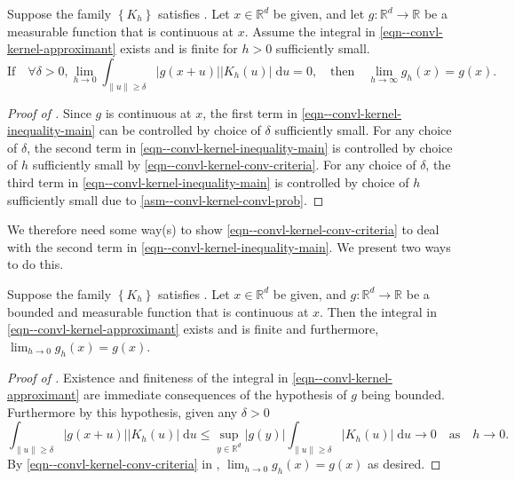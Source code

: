 \begin{lemma}
\label{lem--convl-kernel-conv-criteria}
Suppose the family \(\left\{ K_{h} \right\}\) satisfies
.
Let \(x \in \mathbb{R}^{d}\) be given, and let \(g : \mathbb{R}^{d} \to
\mathbb{R}\) be a measurable function that is continuous at \(x\).
Assume the integral in \eqref{eqn--convl-kernel-approximant} exists and is
finite for \(h > 0\) sufficiently small.
\begin{equation}
  \text{If} \quad
  \forall \delta > 0, \lim_{h \to 0} \int_{\|u\| \geq \delta} |g
  (x + u)| \left| K_{h} (u) \right| \; \mathrm{d} u = 0,
  \quad \text{then} \quad
  \lim_{h \to \infty} g_{h} (x) = g (x).
  \label{eqn--convl-kernel-conv-criteria}
\end{equation}
\end{lemma}

\begin{proof}[Proof of ]
Since \(g\) is continuous at \(x\), the first term in
\eqref{eqn--convl-kernel-inequality-main} can be controlled by choice of
\(\delta\) sufficiently small.
For any choice of \(\delta\), the second term in
\eqref{eqn--convl-kernel-inequality-main} is controlled by choice of \(h\)
sufficiently small by
\eqref{eqn--convl-kernel-conv-criteria}.
For any choice of \(\delta\), the third term in
\eqref{eqn--convl-kernel-inequality-main} is controlled by choice of \(h\)
sufficiently small due to 
\ref{asm--convl-kernel-convl-prob}.
\end{proof}

We therefore need some way(s) to show \eqref{eqn--convl-kernel-conv-criteria} to
deal with the second term in \eqref{eqn--convl-kernel-inequality-main}.
We present two ways to do this.


\begin{theorem}
\label{thm--convl-kernel-conv-bounded}
Suppose the family \(\left\{ K_{h} \right\}\) satisfies
.
Let \(x \in \mathbb{R}^{d}\) be given, and \(g : \mathbb{R}^{d} \to \mathbb{R}\)
be a bounded and measurable function that is continuous at \(x\).
Then the integral in \eqref{eqn--convl-kernel-approximant} exists and is finite
and furthermore, \(\lim_{h \to 0} g_{h} (x) = g (x)\).
\end{theorem}

\begin{proof}[Proof of ]
Existence and finiteness of the integral in
\eqref{eqn--convl-kernel-approximant} are immediate consequences of the
hypothesis of \(g\) being bounded.
Furthermore by this hypothesis, given any \(\delta > 0\)
\begin{equation*}
  \int_{\|u\| \geq \delta} |g (x + u)| \left| K_{h} (u) \right| \; \mathrm{d} u
  \leq \sup_{y \in \mathbb{R}^{d}} |g (y)| \int_{\|u\| \geq \delta}
  \left| K_{h} (u) \right| \; \mathrm{d} u \to 0 \quad \text{as} \quad h \to 0.
\end{equation*}
By \eqref{eqn--convl-kernel-conv-criteria} in
, \(\lim_{h \to 0} g_{h} (x) = g (x)\) as
desired.
\end{proof}

